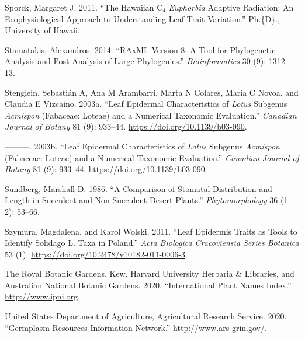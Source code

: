 \documentclass[
  12pt,
]{article}
\newlength{\cslhangindent}
\newlength{\cslentryspacingunit} %
\newenvironment{CSLReferences}[2] %
 {%
  \setlength{\parindent}{0pt}
  \ifodd #1
  \let\oldpar\par
  \def\par{\hangindent=\cslhangindent\oldpar}
  \fi
  \setlength{\parskip}{#2\cslentryspacingunit}
 }%
 {}
\begin{document}
\begin{CSLReferences}{1}{0}
\leavevmode{}%
Sporck, Margaret J. 2011. {``The {Hawaiian} {C}\(_{\textrm{4}}\) \emph{Euphorbia} Adaptive Radiation: An Ecophysiological Approach to Understanding Leaf Trait Variation.''} Ph.\{D\}., University of Hawaii.

\leavevmode{}%
Stamatakis, Alexandros. 2014. {``{RAxML} Version 8: A Tool for Phylogenetic Analysis and Post-Analysis of Large Phylogenies.''} \emph{Bioinformatics} 30 (9): 1312--13.

\leavevmode{}%
Stenglein, Sebastián A, Ana M Arambarri, Marta N Colares, María C Novoa, and Claudia E Vizcaíno. 2003a. {``Leaf Epidermal Characteristics of \emph{Lotus} Subgenus \emph{Acmispon} ({Fabaceae}: {Loteae}) and a Numerical Taxonomic Evaluation.''} \emph{Canadian Journal of Botany} 81 (9): 933--44. \url{https://doi.org/10.1139/b03-090}.

\leavevmode{}%
---------. 2003b. {``Leaf Epidermal Characteristics of \emph{Lotus} Subgenus \emph{Acmispon} ({Fabaceae}: {Loteae}) and a Numerical Taxonomic Evaluation.''} \emph{Canadian Journal of Botany} 81 (9): 933--44. \url{https://doi.org/10.1139/b03-090}.

\leavevmode{}%
Sundberg, Marshall D. 1986. {``A Comparison of Stomatal Distribution and Length in Succulent and Non-Succulent Desert Plants.''} \emph{Phytomorphology} 36 (1-2): 53--66.

\leavevmode{}%
Szymura, Magdalena, and Karol Wolski. 2011. {``Leaf {Epidermis} {Traits} as {Tools} to {Identify} {Solidago} {L}. {Taxa} in {Poland}.''} \emph{Acta Biologica Cracoviensia Series Botanica} 53 (1). \url{https://doi.org/10.2478/v10182-011-0006-3}.

\leavevmode{}%
The Royal Botanic Gardens, Kew, Harvard University Herbaria \& Libraries, and Australian National Botanic Gardens. 2020. {``International {Plant} {Names} {Index}.''} \url{http://www.ipni.org}.

\leavevmode{}%
United States Department of Agriculture, Agricultural Research Service. 2020. {``Germplasm {Resources} {Information} {Network}.''} \url{http://www.ars-grin.gov/.}


\end{CSLReferences}
\end{document}
